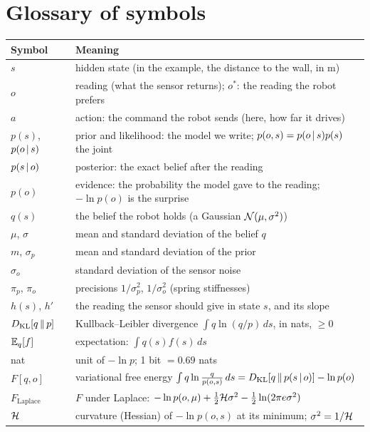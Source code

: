 \documentclass[11pt]{article}
\newcommand{\Fl}{F_{\text{Laplace}}}
\begin{document}
\section{Glossary of symbols}
\small
\begin{longtable}{@{}p{}p{}@{}}
\toprule
Symbol & Meaning \\
\midrule
$s$ & hidden state (in the example, the distance to the wall, in m) \\
$o$ & reading (what the sensor returns); $o^*$: the reading the robot prefers \\
$a$ & action: the command the robot sends (here, how far it drives) \\
$p(s)$, $p(o\,|\, s)$ & prior and likelihood: the model we write; $p(o,s) = p(o\,|\, s)p(s)$ the joint \\
$p(s\,|\, o)$ & posterior: the exact belief after the reading \\
$p(o)$ & evidence: the probability the model gave to the reading; $-\ln p(o)$ is the surprise \\
$q(s)$ & the belief the robot holds (a Gaussian $\mathcal{N}(\mu,\sigma^2)$) \\
$\mu$, $\sigma$ & mean and standard deviation of the belief $q$ \\
$m$, $\sigma_p$ & mean and standard deviation of the prior \\
$\sigma_o$ & standard deviation of the sensor noise \\
$\pi_p$, $\pi_o$ & precisions $1/\sigma_p^2$, $1/\sigma_o^2$ (spring stiffnesses) \\
$h(s)$, $h'$ & the reading the sensor should give in state $s$, and its slope \\
$D_{\mathrm{KL}}\!\left[q\,\middle\|\,p\right]$ & Kullback--Leibler divergence $\int q\ln(q/p)\,ds$, in nats, $\ge0$ \\
$\mathbb{E}_q[f]$ & expectation: $\int q(s)f(s)\,ds$ \\
nat & unit of $-\ln p$; 1 bit $=0.69$ nats \\
$F[q,o]$ & variational free energy $\int q\ln\frac{q}{p(o,s)}\,ds = D_{\mathrm{KL}}\!\left[q\,\middle\|\,p(s\,|\, o)\right] - \ln p(o)$ \\
$\Fl$ & $F$ under Laplace: $-\ln p(o,\mu)+\tfrac12\mathcal{H}\sigma^2-\tfrac12\ln(2\pi e\sigma^2)$ \\
$\mathcal{H}$ & curvature (Hessian) of $-\ln p(o,s)$ at its minimum; $\sigma^2=1/\mathcal{H}$ \\

\end{longtable}
\end{document}

